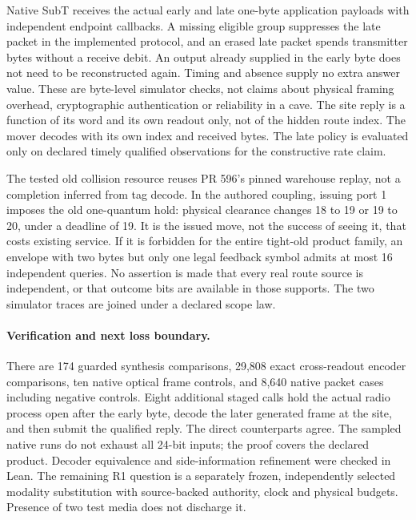 \documentclass[11pt]{article}
\begin{document}
Native SubT receives the actual early and late one-byte
application payloads with independent endpoint callbacks.
A missing eligible group suppresses the late packet in
the implemented protocol, and an erased late packet spends
transmitter bytes without a receive debit. An output already
supplied in the early byte does not need to be reconstructed
again. Timing and absence supply no extra answer value.
These are byte-level simulator checks, not claims about
physical framing overhead, cryptographic authentication
or reliability in a cave. The site reply is a function
of its word and its own readout only, not of the hidden
route index. The mover decodes with its own index and
received bytes. The late policy is evaluated only on declared
timely qualified observations for the constructive rate claim.

The tested old collision resource reuses PR 596's pinned
warehouse replay, not a completion inferred from tag decode.
In the authored coupling, issuing port 1 imposes the old
one-quantum hold: physical clearance changes 18 to 19 or
19 to 20, under a deadline of 19. It is the issued move,
not the success of seeing it, that costs existing service.
If it is forbidden for the entire tight-old product family,
an envelope with two bytes but only one legal feedback
symbol admits at most 16 independent queries. No assertion
is made that every real route source is independent, or
that outcome bits are available in those supports. The
two simulator traces are joined under a declared scope law.

\paragraph{Verification and next loss boundary.}
There are 174 guarded synthesis comparisons, 29,808 exact
cross-readout encoder comparisons, ten native optical frame
controls, and 8,640 native packet cases including negative
controls. Eight additional staged calls hold the actual radio
process open after the early byte, decode the later generated
frame at the site, and then submit the qualified reply. The direct
counterparts agree. The sampled native
runs do not exhaust all 24-bit inputs; the proof covers the
declared product. Decoder equivalence and side-information
refinement were checked in Lean. The remaining R1 question
is a separately frozen, independently selected modality
substitution with source-backed authority, clock and physical
budgets. Presence of two test media does not discharge it.
\end{document}
